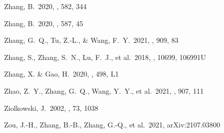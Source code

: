 \documentclass[twocolumn]{aastex62}
\begin{document}
\begin{thebibliography}
 Zhang, B.\ 2020, \nat, 582, 344

 Zhang, B.\ 2020, \nat, 587, 45

 Zhang, G.~Q., Tu, Z.-L., \& Wang, F.~Y.\ 2021, \apj, 909, 83

 Zhang, S., Zhang, S.~N., Lu, F.~J., et al.\ 2018, \procspie, 10699, 106991U

 Zhang, X. \& Gao, H.\ 2020, \mnras, 498, L1

 Zhao, Z.~Y., Zhang, G.~Q., Wang, Y.~Y., et al.\ 2021, \apj, 907, 111

 Ziolkowski, J.\ 2002, \memsai, 73, 1038

 Zou, J.-H., Zhang, B.-B., Zhang, G.-Q., et al.\ 2021, arXiv:2107.03800

\end{thebibliography}
\end{document}
